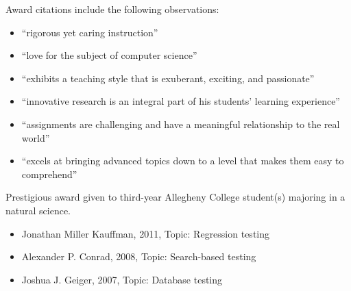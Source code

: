\documentclass[11pt,letterpaper,sans]{moderncv/moderncv}
\begin{document}
{Award citations include the following observations: \vspace*{.025in}
  \begin{itemize}
    \renewcommand\labelitemi{\Large\textbullet}
    \item ``rigorous yet caring instruction''
    \item ``love for the subject of computer science''
    \item ``exhibits a teaching style that is exuberant, exciting, and passionate''
    \item ``innovative research is an integral part of his students’ learning experience''
    \item ``assignments are challenging and have a meaningful relationship to the real world''
    \item ``excels at bringing advanced topics down to a level that makes them easy to comprehend''
  \end{itemize}}


{Prestigious award given to third-year Allegheny College student(s) majoring in a natural science. \vspace*{.025in}
  \begin{itemize}
    \renewcommand\labelitemi{\Large\textbullet}
    \item Jonathan Miller Kauffman, 2011, Topic: Regression testing
    \item Alexander P. Conrad, 2008, Topic: Search-based testing
    \item Joshua J. Geiger, 2007, Topic: Database testing
  \end{itemize}\vspace*{.05in}}

\end{document}
